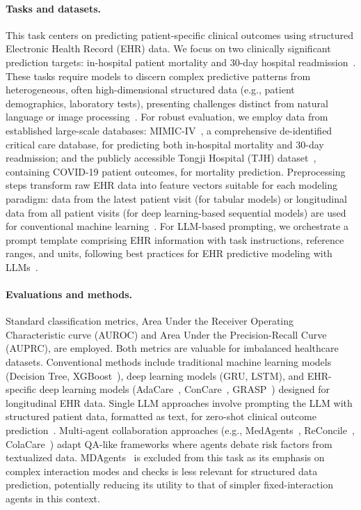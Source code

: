 \documentclass{article}
\begin{document}
\paragraph{Tasks and datasets.} This task centers on predicting patient-specific clinical outcomes using structured Electronic Health Record (EHR) data. We focus on two clinically significant prediction targets: in-hospital patient mortality and 30-day hospital readmission~\cite{purushotham2018benchmarking,harutyunyan2019multitask,cummins2025hospital}. These tasks require models to discern complex predictive patterns from heterogeneous, often high-dimensional structured data (e.g., patient demographics, laboratory tests), presenting challenges distinct from natural language or image processing~\cite{liu2021advances}. For robust evaluation, we employ data from established large-scale databases: MIMIC-IV~\cite{johnson2023mimic,johnson2024mimiciv}, a comprehensive de-identified critical care database, for predicting both in-hospital mortality and 30-day readmission; and the publicly accessible Tongji Hospital (TJH) dataset~\cite{yan2020interpretable}, containing COVID-19 patient outcomes, for mortality prediction. Preprocessing steps transform raw EHR data into feature vectors suitable for each modeling paradigm: data from the latest patient visit (for tabular models) or longitudinal data from all patient visits (for deep learning-based sequential models) are used for conventional machine learning~\cite{gao2024comprehensive,zhu2023pyehr,liao2025PAI,zhu2024prism,wu2025exploring,ma2023mortality}. For LLM-based prompting, we orchestrate a prompt template comprising EHR information with task instructions, reference ranges, and units, following best practices for EHR predictive modeling with LLMs~\cite{zhu2024clinicrealm}.

\paragraph{Evaluations and methods.} Standard classification metrics, Area Under the Receiver Operating Characteristic curve (AUROC) and Area Under the Precision-Recall Curve (AUPRC), are employed. Both metrics are valuable for imbalanced healthcare datasets. Conventional methods include traditional machine learning models (Decision Tree, XGBoost~\cite{chen2016xgboost}), deep learning models (GRU, LSTM), and EHR-specific deep learning models (AdaCare~\cite{ma2020adacare}, ConCare~\cite{ma2020concare}, GRASP~\cite{zhang2021grasp}) designed for longitudinal EHR data. Single LLM approaches involve prompting the LLM with structured patient data, formatted as text, for zero-shot clinical outcome prediction~\cite{zhu2024prompting}. Multi-agent collaboration approaches (e.g., MedAgents~\cite{tang2024medagents}, ReConcile~\cite{chen2024reconcile}, ColaCare~\cite{wang2025colacare}) adapt QA-like frameworks where agents debate risk factors from textualized data. MDAgents~\cite{kim2024mdagents} is excluded from this task as its emphasis on complex interaction modes and checks is less relevant for structured data prediction, potentially reducing its utility to that of simpler fixed-interaction agents in this context.
\end{document}
